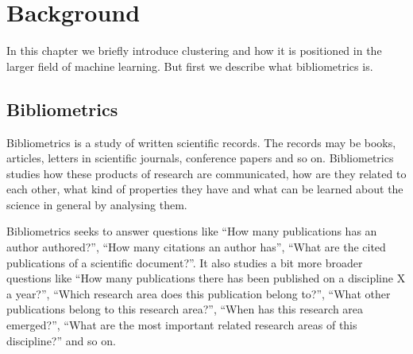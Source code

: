 \chapter{Background}
\label{chapter:background}

% 


In this chapter we briefly introduce clustering and how it is 
positioned in the larger field of machine learning. But first we
describe what bibliometrics is.

\section{Bibliometrics}
\label{sec:bibliometrics}
Bibliometrics is a study of written scientific records. The 
records may be books, articles, letters in scientific journals, 
conference papers and so on. Bibliometrics studies how these 
products of research are communicated, how are they related to 
each other, what kind of properties they have and what can be 
learned about the science in general by analysing them.

Bibliometrics seeks to answer questions like ``How many 
publications has an author authored?'', ``How many citations an 
author has'', ``What are the 
cited publications of a scientific document?''. It also studies
a bit more broader questions like ``How many publications there 
has been published on a discipline X a year?'', ``Which research area
does this publication belong to?'', ``What other publications 
belong to this research area?'', ``When has this research area
emerged?'', ``What are the most important related research areas
of this discipline?'' and so 
on.\cite{pritchard_statistical_1969}\cite{broadus_toward_1987}

